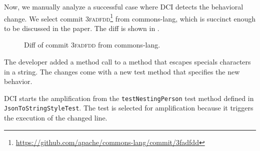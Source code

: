 Now, we manually analyze a successful case where DCI detects the behavioral change.
We select commit \textsc{3fadfdd}\footnote{\url{https://github.com/apache/commons-lang/commit/3fadfdd}} from commons-lang, which is succinct enough to be discussed in the paper.
The diff is shown in .

\begin{figure}[h]
\centering
{}
\caption{Diff of commit \textsc{3fadfdd} from commons-lang.}
\label{fig:diff_commons_lang_success}
\end{figure}

The developer added a method call to a method that escapes specials characters in a string. 
The changes come with a new test method that specifies the new behavior. 

DCI starts the amplification from the \texttt{testNestingPerson} test method defined in \texttt{JsonToStringStyleTest}. The test is selected for amplification because it triggers the execution of the changed line.

